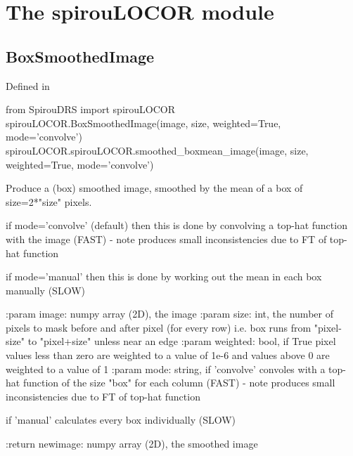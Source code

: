 
\clearpage
\newpage
\begin{minipage}{\textwidth}
\section{The spirouLOCOR module}
\label{ch:the_module:spirouLOCOR}

\subsection{BoxSmoothedImage}

Defined in \spirouLOCOR{}

\begin{pythonbox}
from SpirouDRS import spirouLOCOR
spirouLOCOR.BoxSmoothedImage(image, size, weighted=True, mode='convolve')
spirouLOCOR.spirouLOCOR.smoothed_boxmean_image(image, size, weighted=True, mode='convolve')
\end{pythonbox}

\begin{pythondocstring}
Produce a (box) smoothed image, smoothed by the mean of a box of
    size=2*"size" pixels.

    if mode='convolve' (default) then this is done
    by convolving a top-hat function with the image (FAST)
    - note produces small inconsistencies due to FT of top-hat function

    if mode='manual' then this is done by working out the mean in each
    box manually (SLOW)

:param image: numpy array (2D), the image
:param size: int, the number of pixels to mask before and after pixel
             (for every row)
             i.e. box runs from  "pixel-size" to "pixel+size" unless
             near an edge
:param weighted: bool, if True pixel values less than zero are weighted to
                 a value of 1e-6 and values above 0 are weighted to a value
                 of 1
:param mode: string, if 'convolve' convoles with a top-hat function of the
                     size "box" for each column (FAST) - note produces small
                     inconsistencies due to FT of top-hat function

                     if 'manual' calculates every box individually (SLOW)

:return newimage: numpy array (2D), the smoothed image
\end{pythondocstring}
\end{minipage}


